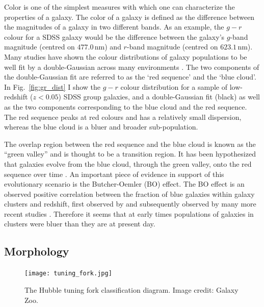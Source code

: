 Color is one of the simplest measures with which one can characterize
the properties of a galaxy.  The color of a galaxy is defined as the
difference between the magnitudes of a galaxy in two different bands.
As an example, the $g - r$ colour for a SDSS galaxy would be the
difference between the galaxy's $g$-band magnitude (centred on
$477.0\,\mathrm{nm}$) and $r$-band magnitude (centred on
$623.1\,\mathrm{nm}$).  Many studies have shown the colour
distributions of galaxy populations to be well fit by a
double-Gaussian across many environments \citep{balogh2004,
  baldry2006}.  The two
components of the double-Gaussian fit are referred to as the `red
sequence' and the `blue cloud'.  In Fig.~\ref{fig:gr_dist} I show the
$g-r$ colour distribution for a sample of low-redshift ($z < 0.05$)
SDSS group galaxies, and a double-Gaussian fit (black) as well as the
two components corresponding to the blue cloud and the red sequence.
The red sequence peaks at red colours and has a
relatively small dispersion, whereas the blue cloud is a bluer and
broader sub-population.
\par
The overlap region between the red sequence
and the blue cloud is known as the ``green valley'' and is thought to
be a transition region.  It has been hypothesized that galaxies evolve
from the blue cloud, through the green valley, onto the red sequence
over time \citep[e.g.][]{trayford2016}.  An important piece of evidence in
support of
this evolutionary scenario is the Butcher-Oemler (BO) effect.  The BO
effect is an observed positive correlation between the fraction of blue
galaxies within galaxy clusters and redshift, first observed by
\citet{butcher1978} and subsequently observed by many more recent
studies \citep[e.g.][]{butcher1984, ellingson2001, loh2008,
  urquhart2010}.  Therefore it seems that at early times populations
of galaxies in clusters were bluer than they are at present day.    

\subsection{Morphology}
\label{sec:morph}

\begin{figure}[!ht]
  \centering
  \texttt{[image: tuning\_fork.jpg]}
  \caption{The Hubble tuning fork classification diagram.  Image
    credit: Galaxy Zoo.}
  \label{fig:tuning_fork}
\end{figure}

